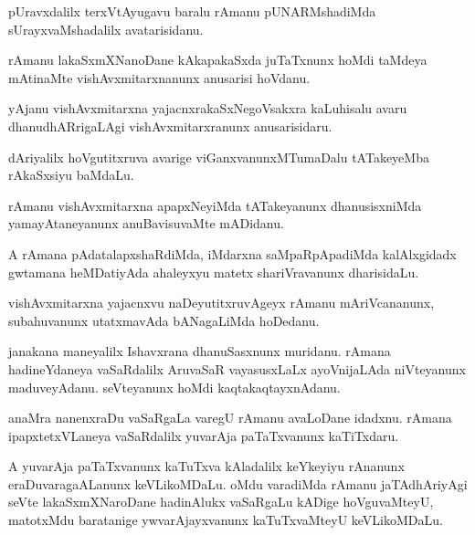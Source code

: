 \documentclass{article}
\begin{document}
\begin{mn}%
pUravxdalilx terxVtAyugavu baralu rAmanu pUNARMshadiMda sUrayxvaMshadalilx avatarisidanu.
\end{mn}

\begin{mn}%
rAmanu lakaSxmXNanoDane kAkapakaSxda juTaTxnunx hoMdi taMdeya mAtinaMte 
vishAvxmitarxnanunx anusarisi hoVdanu.
\end{mn}

\begin{mn}%
yAjanu vishAvxmitarxna yajacnxrakaSxNegoVsakxra kaLuhisalu avaru dhanudhARrigaLAgi 
vishAvxmitarxranunx anusarisidaru.
\end{mn}

\begin{mn}%
dAriyalilx hoVgutitxruva avarige viGanxvanunxMTumaDalu tATakeyeMba rAkaSxsiyu baMdaLu.
\end{mn}

\begin{mn}%
rAmanu vishAvxmitarxna apapxNeyiMda tATakeyanunx dhanusisxniMda yamayAtaneyanunx 
anuBavisuvaMte mADidanu.
\end{mn}

\begin{mn}%
A rAmana pAdatalapxshaRdiMda, iMdarxna saMpaRpApadiMda kalAlxgidadx gwtamana heMDatiyAda 
ahaleyxyu matetx shariVravanunx dharisidaLu.
\end{mn}

\begin{mn}%
vishAvxmitarxna yajacnxvu naDeyutitxruvAgeyx rAmanu mAriVcananunx, subahuvanunx 
utatxmavAda bANagaLiMda hoDedanu.
\end{mn}

\begin{mn}%
janakana maneyalilx Ishavxrana dhanuSasxnunx muridanu. rAmana hadineYdaneya vaSaRdalilx 
AruvaSaR vayasusxLaLx ayoVnijaLAda niVteyanunx maduveyAdanu. seVteyanunx hoMdi 
kaqtakaqtayxnAdanu.
\end{mn}

\begin{mn}%
anaMra nanenxraDu vaSaRgaLa varegU rAmanu avaLoDane idadxnu. rAmana ipapxtetxVLaneya 
vaSaRdalilx yuvarAja paTaTxvanunx kaTiTxdaru.
\end{mn}

\begin{mn}%
A yuvarAja paTaTxvanunx kaTuTxva kAladalilx keYkeyiyu rAnanunx  eraDuvaragaALanunx 
keVLikoMDaLu. oMdu varadiMda rAmanu jaTAdhAriyAgi seVte lakaSxmXNaroDane hadinAlukx 
vaSaRgaLu kADige hoVguvaMteyU, matotxMdu baratanige ywvarAjayxvanunx kaTuTxvaMteyU 
keVLikoMDaLu.
\end{mn}
\end{document}
